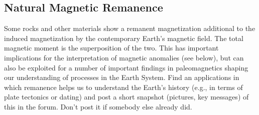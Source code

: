 \subsection{Natural Magnetic Remanence}
\label{Sec:Remanence}
Some rocks and other materials show a remanent magnetization additional to the induced magnetization by the contemporary Earth's magnetic field. The total magnetic moment is the superposition of the two. This has important implications for the interpretation of magnetic anomalies (see below), but can also be exploited for a number of important findings in paleomagnetics shaping our understanding of processes in the Earth System. Find an applications in which remanence helps us to understand the Earth's history (e.g., in terms of plate tectonics or dating) and post a short snapshot (pictures, key messages) of this in the forum. Don't post it if somebody else already did.

